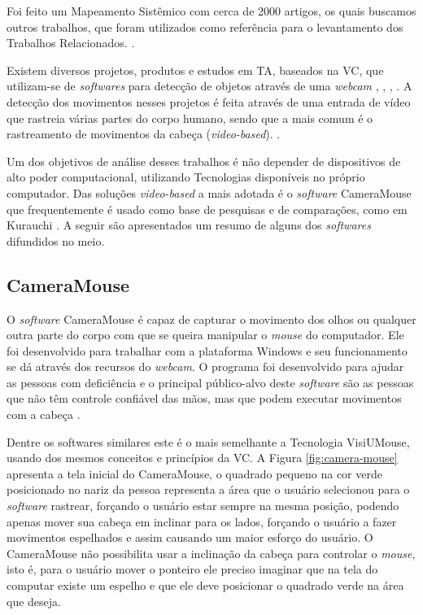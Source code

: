 Foi feito um Mapeamento Sistêmico com cerca de 2000 artigos, os quais buscamos outros trabalhos, que foram utilizados como referência para o levantamento dos Trabalhos Relacionados. \cite{da2018best-UPPERCASE}.

Existem diversos projetos, produtos e estudos em TA, baseados na VC, que utilizam-se de \textit{softwares} para detecção de objetos através de uma \textit{webcam} \cite{ramos2016letras} , \cite{gips2000camera}, \cite{bian2016facial}, \cite{marnik2014blinkmouse}. A detecção dos movimentos nesses projetos é feita através de uma entrada de vídeo que rastreia várias partes do corpo humano, sendo que a mais comum é o rastreamento de movimentos da cabeça (\textit{video-based}). \cite{al2013eye-UPPERCASE}. 

Um dos objetivos de análise desses trabalhos é não depender de dispositivos de alto poder computacional, utilizando Tecnologias disponíveis no próprio computador. Das soluções \textit{video-based} a mais adotada é o \textit{software} CameraMouse \cite{gips2000camera} que frequentemente é usado como base de pesquisas e de comparações, como em Kurauchi \cite{kurauchi2015hmagic}. A seguir são apresentados um resumo de alguns dos \textit{softwares} difundidos no meio.

\subsection{CameraMouse}
O \textit{software} CameraMouse é capaz de capturar o movimento dos olhos ou qualquer outra parte do corpo com que se queira manipular o \textit{mouse} do computador. Ele foi desenvolvido para trabalhar com a plataforma Windows e seu funcionamento se dá através dos recursos do \textit{webcam}. O programa foi desenvolvido para ajudar as pessoas com deficiência e o principal público-alvo deste \textit{software} são as pessoas que não têm controle confiável das mãos, mas que podem executar movimentos com a cabeça .

Dentre os softwares similares este é o mais semelhante a Tecnologia VisiUMouse, usando dos mesmos conceitos e princípios da VC. A Figura \ref{fig:camera-mouse} apresenta a tela inicial do CameraMouse, o quadrado pequeno na cor verde posicionado no nariz da pessoa representa a área que o usuário selecionou para o \textit{software} rastrear, forçando o usuário estar sempre na mesma posição, podendo apenas mover sua cabeça em inclinar para os lados, forçando o usuário a fazer movimentos espelhados  e assim causando um maior esforço do usuário. O CameraMouse não possibilita usar a inclinação da cabeça para controlar o \textit{mouse}, isto é, para o usuário mover o ponteiro ele preciso imaginar que na tela do computar existe um espelho e que ele deve posicionar o quadrado verde na área que deseja.

